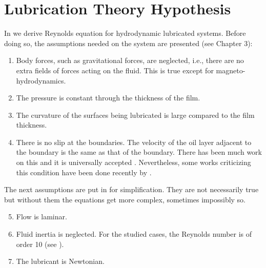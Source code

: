 \section{Lubrication Theory Hypothesis}\label{sec:lub_hyp}
In  we derive Reynolds equation for hydrodynamic lubricated systems. Before doing so, the assumptions needed on the system are presented (see \cite{cameron1971} Chapter 3):
\begin{enumerate}
\item Body forces, such as gravitational forces, are neglected, i.e., there are no extra fields of forces acting on the fluid. This is true except for magneto-hydrodynamics.
\item The pressure is constant through the thickness of the film. %
\item The curvature of the surfaces being lubricated is large compared to the film thickness.%
\item There is no slip at the boundaries. The velocity of the oil layer adjacent to the boundary is the same as that of the boundary. There has been much work on this and it is universally accepted \cite{cameron1971}. Nevertheless, some works criticizing this condition have been done recently by \citeauthor{salant2004} \cite{salant2004,fortier2005}.
\end{enumerate}
The next assumptions are put in for simplification. They are not necessarily true but without them the equations get more complex, sometimes impossibly so.
\begin{enumerate}
\setcounter{enumi}{4}
\item Flow is laminar. %
\item Fluid inertia is neglected. For the studied cases, the Reynolds number is of order 10 (see ).%
\item The lubricant is Newtonian.%

\end{enumerate}
